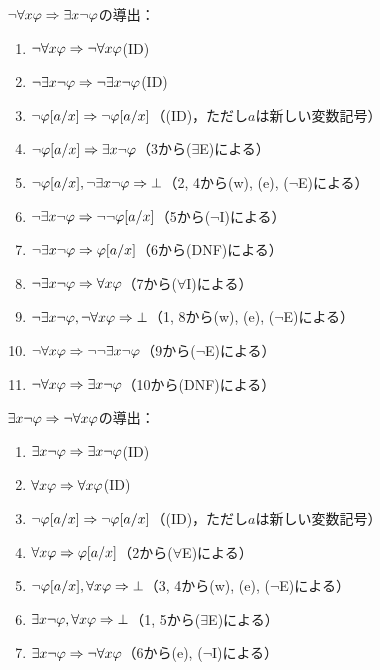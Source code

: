 \(\lnot \forall x \varphi \Rightarrow \exists x \lnot \varphi\)の導出：
\begin{enumerate}
	\item \(\lnot \forall x \varphi \Rightarrow \lnot \forall x \varphi\)\quad (ID)
	\item \(\lnot \exists x \lnot \varphi \Rightarrow \lnot \exists x \lnot \varphi\)\quad (ID)
	\item \(\lnot \subst{\varphi}{a/x} \sequent \lnot \subst{\varphi}{a/x}\)\quad （(ID)，ただし\(a\)は新しい変数記号）
	\item \(\lnot \subst{\varphi}{a/x} \sequent \exists x \lnot \varphi\)\quad （3から(\(\exists\)E)による）
	\item \(\lnot \subst{\varphi}{a/x}, \lnot \exists x \lnot \varphi \sequent \bot\)\quad （2, 4から(w), (e), (\(\lnot\)E)による）
	\item \(\lnot \exists x \lnot \varphi \sequent \lnot \lnot \subst{\varphi}{a/x}\)\quad （5から(\(\lnot\)I)による）
	\item \(\lnot \exists x \lnot \varphi \sequent \subst{\varphi}{a/x}\)\quad （6から(DNF)による）
	\item \(\lnot \exists x \lnot \varphi \Rightarrow \forall x \varphi\)\quad （7から(\(\forall\)I)による）
	\item \(\lnot \exists x \lnot \varphi, \lnot \forall x \varphi \Rightarrow \bot\)\quad （1, 8から(w), (e), (\(\lnot\)E)による）
	\item \(\lnot \forall x \varphi \Rightarrow \lnot \lnot \exists x \lnot \varphi\)\quad （9から(\(\lnot\)E)による）
	\item \(\lnot \forall x \varphi \Rightarrow \exists x \lnot \varphi\)\quad （10から(DNF)による）
\end{enumerate}

\(\exists x \lnot \varphi \Rightarrow \lnot \forall x \varphi\)の導出：
\begin{enumerate}
	\item \(\exists x \lnot \varphi \Rightarrow \exists x \lnot \varphi\)\quad (ID)
	\item \(\forall x \varphi \Rightarrow \forall x \varphi\)\quad (ID)
	\item \(\lnot \subst{\varphi}{a/x} \sequent \lnot \subst{\varphi}{a/x}\)\quad （(ID)，ただし\(a\)は新しい変数記号）
	\item \(\forall x \varphi \sequent \subst{\varphi}{a/x}\)\quad （2から(\(\forall\)E)による）
	\item \(\lnot \subst{\varphi}{a/x}, \forall x \varphi \sequent \bot\)\quad （3, 4から(w), (e), (\(\lnot\)E)による）
	\item \(\exists x \lnot \varphi, \forall x \varphi \Rightarrow \bot\)\quad （1, 5から(\(\exists\)E)による）
	\item \(\exists x \lnot \varphi \Rightarrow \lnot \forall x \varphi\)\quad （6から(e), (\(\lnot\)I)による）
\end{enumerate}

